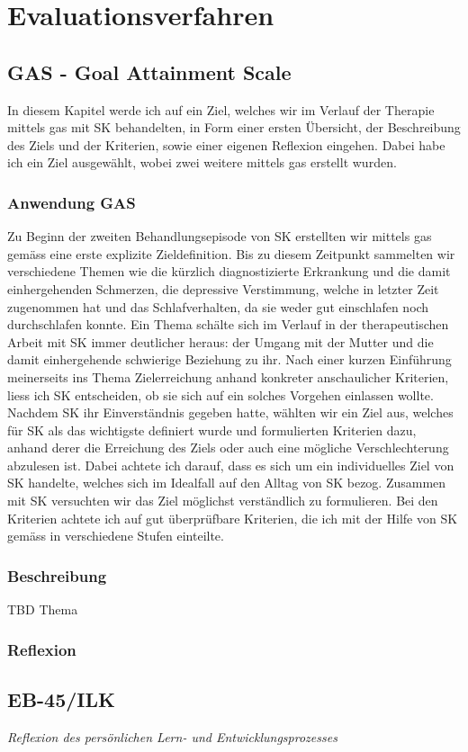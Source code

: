 \section{Evaluationsverfahren}\label{sec:Evaluationsverfahren}

\subsection{GAS - Goal Attainment Scale}
In diesem Kapitel werde ich auf ein Ziel, welches wir im Verlauf der Therapie mittels \ac{gas} mit SK behandelten, in Form einer ersten Übersicht, der Beschreibung des Ziels und der Kriterien, sowie einer eigenen Reflexion eingehen. Dabei habe ich ein Ziel ausgewählt, wobei zwei weitere mittels \ac{gas} erstellt wurden.

\subsubsection{Anwendung GAS}
Zu Beginn der zweiten Behandlungsepisode von SK erstellten wir mittels \ac{gas} gemäss  eine erste explizite Zieldefinition. Bis zu diesem Zeitpunkt sammelten wir verschiedene Themen wie die kürzlich diagnostizierte Erkrankung und die damit einhergehenden Schmerzen, die depressive Verstimmung, welche in letzter Zeit zugenommen hat und das Schlafverhalten, da sie weder gut einschlafen noch durchschlafen konnte. Ein Thema schälte sich im Verlauf in der therapeutischen Arbeit mit SK immer deutlicher heraus: der Umgang mit der Mutter und die damit einhergehende schwierige Beziehung zu ihr. Nach einer kurzen Einführung meinerseits ins Thema Zielerreichung anhand konkreter anschaulicher Kriterien, liess ich SK entscheiden, ob sie sich auf ein solches Vorgehen einlassen wollte. Nachdem SK ihr Einverständnis gegeben hatte, wählten wir ein Ziel aus, welches für SK als das wichtigste definiert wurde und formulierten Kriterien dazu, anhand derer die Erreichung des Ziels oder auch eine mögliche Verschlechterung abzulesen ist. Dabei achtete ich darauf, dass es sich um ein individuelles Ziel von SK handelte, welches sich im Idealfall auf den Alltag von SK bezog. Zusammen mit SK versuchten wir das Ziel möglichst verständlich zu formulieren. Bei den Kriterien achtete ich auf gut überprüfbare Kriterien, die ich mit der Hilfe von SK gemäss  in verschiedene Stufen einteilte. 

\subsubsection{Beschreibung}
TBD Thema

\subsubsection{Reflexion}
\subsection{EB-45/ILK}

\textit{Reflexion des persönlichen Lern- und Entwicklungsprozesses}
 